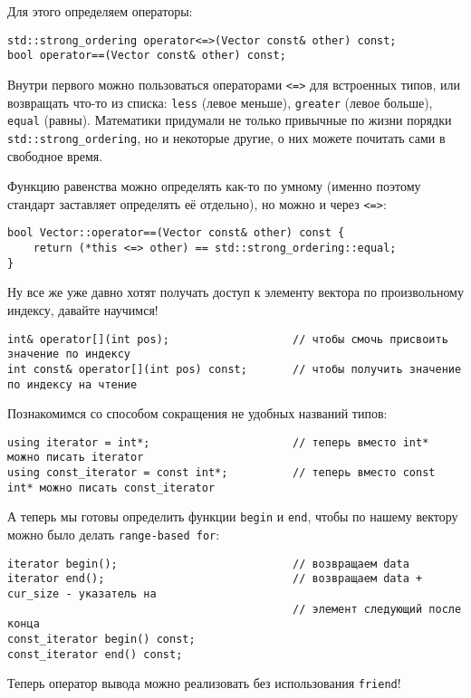 Для этого определяем операторы:

\begin{verbatim}
std::strong_ordering operator<=>(Vector const& other) const;
bool operator==(Vector const& other) const;
\end{verbatim}

Внутри первого можно пользоваться операторами \texttt{<=>} для встроенных типов, или возвращать что-то из списка: \texttt{less} (левое меньше), \texttt{greater} (левое больше), \texttt{equal} (равны). Математики придумали не только привычные по жизни порядки \texttt{std::strong_ordering}, но и некоторые другие, о них можете почитать сами в свободное время.

Функцию равенства можно определять как-то по умному (именно поэтому стандарт заставляет определять её отдельно), но можно и через \texttt{<=>}:
\begin{verbatim}
bool Vector::operator==(Vector const& other) const {
    return (*this <=> other) == std::strong_ordering::equal;
}
\end{verbatim}


Ну все же уже давно хотят получать доступ к элементу вектора по произвольному индексу, давайте научимся!
\begin{verbatim}
int& operator[](int pos);                   // чтобы смочь присвоить значение по индексу
int const& operator[](int pos) const;       // чтобы получить значение по индексу на чтение
\end{verbatim}

Познакомимся со способом сокращения не удобных названий типов:
\begin{verbatim}
using iterator = int*;                      // теперь вместо int* можно писать iterator
using const_iterator = const int*;          // теперь вместо const int* можно писать const_iterator
\end{verbatim}

А теперь мы готовы определить функции \texttt{begin} и \texttt{end}, чтобы по нашему вектору можно было делать \texttt{range-based for}:
\begin{verbatim}
iterator begin();                           // возвращаем data
iterator end();                             // возвращаем data + cur_size - указатель на
                                            // элемент следующий после конца
const_iterator begin() const;
const_iterator end() const;
\end{verbatim}

Теперь оператор вывода можно реализовать без использования \texttt{friend}!
